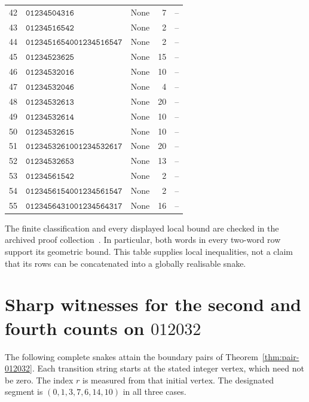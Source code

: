 \documentclass[11pt,a4paper]{article}
\theoremstyle{definition}
\theoremstyle{remark}
\begin{document}
\begin{longtable}{r p{} p{} r r}
42 & \(\mathtt{01234504316}\) & None & 7 & --\\
43 & \(\mathtt{01234516542}\) & None & 2 & --\\
44 & \(\mathtt{01234516540}\)\newline \(\mathtt{01234516547}\) & None & 2 & --\\
45 & \(\mathtt{01234523625}\) & None & 15 & --\\
46 & \(\mathtt{01234532016}\) & None & 10 & --\\
47 & \(\mathtt{01234532046}\) & None & 4 & --\\
48 & \(\mathtt{01234532613}\) & None & 20 & --\\
49 & \(\mathtt{01234532614}\) & None & 10 & --\\
50 & \(\mathtt{01234532615}\) & None & 10 & --\\
51 & \(\mathtt{01234532610}\)\newline \(\mathtt{01234532617}\) & None & 20 & --\\
52 & \(\mathtt{01234532653}\) & None & 13 & --\\
53 & \(\mathtt{01234561542}\) & None & 2 & --\\
54 & \(\mathtt{01234561540}\)\newline \(\mathtt{01234561547}\) & None & 2 & --\\
55 & \(\mathtt{01234564310}\)\newline \(\mathtt{01234564317}\) & None & 16 & --\\
\end{longtable}
\endgroup
The finite classification and every displayed local bound are checked in
the archived proof collection~\cite{historycreditarchive}. In particular,
both words in every two-word row support its geometric bound. This table
supplies local inequalities, not a claim that its rows can be concatenated
into a globally realisable snake.

\section{Sharp witnesses for the second and fourth counts on $012032$}\label{app:pair-012032-witnesses}

The following complete snakes attain the boundary pairs of Theorem~\ref{thm:pair-012032}. Each transition string starts at the stated integer vertex, which need not be zero. The index $r$ is measured from that initial vertex. The designated segment is $(0,1,3,7,6,14,10)$ in all three cases.
\end{document}
